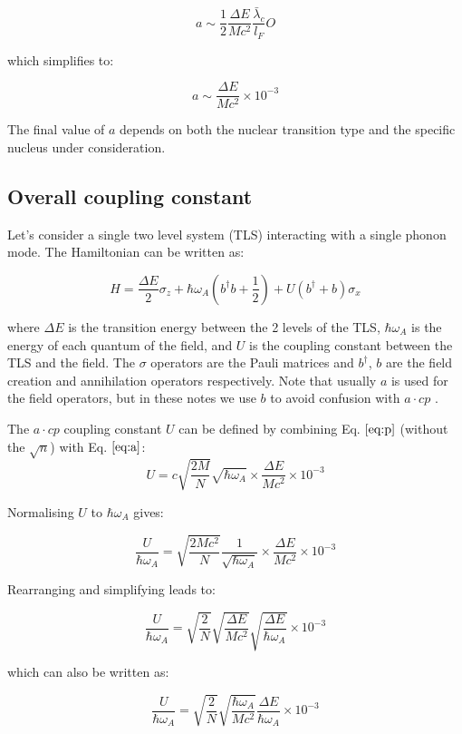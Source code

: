 \documentclass[
]{article}
\renewcommand{\[}{\begin{equation}}
\renewcommand{\]}{\end{equation}}
\begin{document}
\[
a \sim \frac{1}{2} \frac{\Delta E}{M c^2} \frac{\bar\lambda_c}{l_F} O 
\]

which simplifies to:

\[
a \sim \frac{\Delta E}{M c^2} \times 10^{-3} 
\label{eq:a}
\]

The final value of \(a\) depends on both the nuclear transition type and
the specific nucleus under consideration.

\subsection{Overall coupling constant}\label{overall-coupling-constant}

Let's consider a single two level system (TLS) interacting with a single
phonon mode. The Hamiltonian can be written as:

\[
H = \frac{\Delta E}{2} \sigma_z + \hbar\omega_A\left(b^{\dagger}b +\frac{1}{2}\right) + U\left( b^{\dagger} + b \right)\sigma_x
\]

where \(\Delta E\) is the transition energy between the 2 levels of the
TLS, \(\hbar\omega_A\) is the energy of each quantum of the field, and
\(U\) is the coupling constant between the TLS and the field. The
\(\sigma\) operators are the Pauli matrices and \(b^{\dagger}\), \(b\)
are the field creation and annihilation operators respectively. Note
that usually \(a\) is used for the field operators, but in these notes
we use \(b\) to avoid confusion with \(a \cdot cp\) .

The \(a \cdot cp\) coupling constant \(U\) can be defined by combining
Eq. \(\ref{eq:p}\) (without the \(\sqrt{n}\)) with Eq. \(\ref{eq:a}\):
\[
U = c \sqrt{\frac{2M}{N}} \sqrt{\hbar \omega_A} \times \frac{\Delta E}{M c^2} \times 10^{-3}
\]

Normalising \(U\) to \(\hbar \omega_A\) gives:

\[
\frac{U}{\hbar \omega_A} = \sqrt{\frac{2M c^2}{N}} \frac{1}{\sqrt{\hbar \omega_A}} \times \frac{\Delta E}{M c^2} \times 10^{-3}
\]

Rearranging and simplifying leads to:

\[
\frac{U}{\hbar \omega_A} = \sqrt{\frac{2}{N}} \sqrt{\frac{\Delta E}{M c^2}} \sqrt{\frac{\Delta E}{\hbar \omega_A}} \times 10^{-3}
\]

which can also be written as:

\[
\frac{U}{\hbar \omega_A} = \sqrt{\frac{2}{N}} \sqrt{\frac{\hbar \omega_A}{M c^2}} \frac{\Delta E}{\hbar \omega_A} \times 10^{-3}
\]
\end{document}
